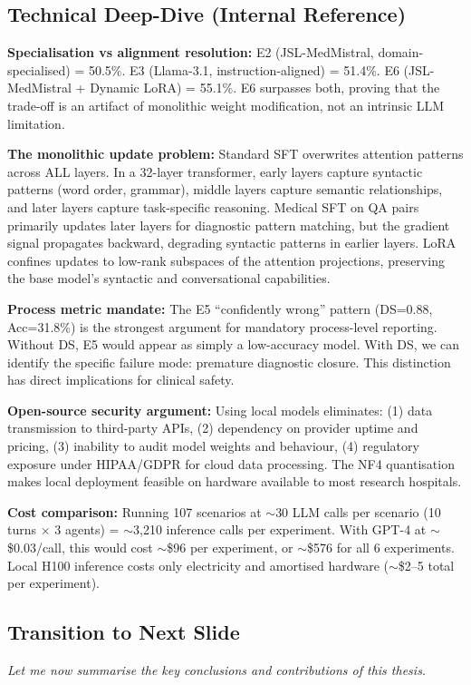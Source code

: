 \subsection*{Technical Deep-Dive (Internal Reference)}
{\color{techgray}
\textbf{Specialisation vs alignment resolution:} E2 (JSL-MedMistral, domain-specialised) = 50.5\%. E3 (Llama-3.1, instruction-aligned) = 51.4\%. E6 (JSL-MedMistral + Dynamic LoRA) = 55.1\%. E6 surpasses both, proving that the trade-off is an artifact of monolithic weight modification, not an intrinsic LLM limitation.

\textbf{The monolithic update problem:} Standard SFT overwrites attention patterns across ALL layers. In a 32-layer transformer, early layers capture syntactic patterns (word order, grammar), middle layers capture semantic relationships, and later layers capture task-specific reasoning. Medical SFT on QA pairs primarily updates later layers for diagnostic pattern matching, but the gradient signal propagates backward, degrading syntactic patterns in earlier layers. LoRA confines updates to low-rank subspaces of the attention projections, preserving the base model's syntactic and conversational capabilities.

\textbf{Process metric mandate:} The E5 ``confidently wrong'' pattern (DS=0.88, Acc=31.8\%) is the strongest argument for mandatory process-level reporting. Without DS, E5 would appear as simply a low-accuracy model. With DS, we can identify the specific failure mode: premature diagnostic closure. This distinction has direct implications for clinical safety.

\textbf{Open-source security argument:} Using local models eliminates: (1) data transmission to third-party APIs, (2) dependency on provider uptime and pricing, (3) inability to audit model weights and behaviour, (4) regulatory exposure under HIPAA/GDPR for cloud data processing. The NF4 quantisation makes local deployment feasible on hardware available to most research hospitals.

\textbf{Cost comparison:} Running 107 scenarios at $\sim$30 LLM calls per scenario (10 turns $\times$ 3 agents) = $\sim$3,210 inference calls per experiment. With GPT-4 at $\sim$\$0.03/call, this would cost $\sim$\$96 per experiment, or $\sim$\$576 for all 6 experiments. Local H100 inference costs only electricity and amortised hardware ($\sim$\$2--5 total per experiment).
}

\subsection*{Transition to Next Slide}
{\color{transgreen}
\textit{Let me now summarise the key conclusions and contributions of this thesis.}
}

